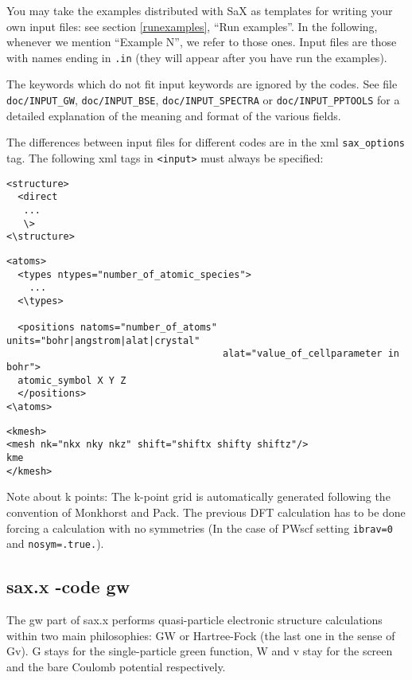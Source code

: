 \documentclass[11pt]{article}
\begin{document}
You may take the examples distributed with SaX as templates for
writing your own input files: see section \ref{runexamples}, ``Run
examples''.  In the following, whenever we mention ``Example N'', we
refer to those ones.
Input files are those with names ending in \texttt{.in} (they will appear after you have run the examples).

The keywords which do not fit input keywords are ignored by the codes.
See file \texttt{doc/INPUT\_GW}, \texttt{doc/INPUT\_BSE}, \texttt{doc/INPUT\_SPECTRA} 
or \texttt{doc/INPUT\_PPTOOLS} for a detailed explanation of the
meaning and format of the various fields.

The differences between input files for different codes are in the xml \texttt{sax\_options} tag.
The following xml tags in \texttt{<input>} must always be
specified:\\

\begin{verbatim}
<structure>
  <direct
   ...
   \>
<\structure>
\end{verbatim}

\begin{verbatim}
<atoms>
  <types ntypes="number_of_atomic_species">
    ...
  <\types>

  <positions natoms="number_of_atoms" units="bohr|angstrom|alat|crystal" 
                                      alat="value_of_cellparameter in bohr">
  atomic_symbol X Y Z
  </positions>
<\atoms>
\end{verbatim}

\begin{verbatim}
<kmesh>
<mesh nk="nkx nky nkz" shift="shiftx shifty shiftz"/>
kme
</kmesh>
\end{verbatim}

Note about k points:
The k-point grid is automatically generated following the convention
of Monkhorst and Pack. The previous DFT calculation has to be done forcing
a calculation with no symmetries (In the case of PWscf setting \texttt{ibrav=0} 
and \texttt{nosym=.true.}).

\subsection{sax.x -code gw}
The gw part of sax.x performs quasi-particle electronic structure calculations within two main 
philosophies: GW or Hartree-Fock (the last one in the sense of Gv). 
G stays for the single-particle green function, W and v stay for the screen and the bare 
Coulomb potential respectively.
\end{document}

